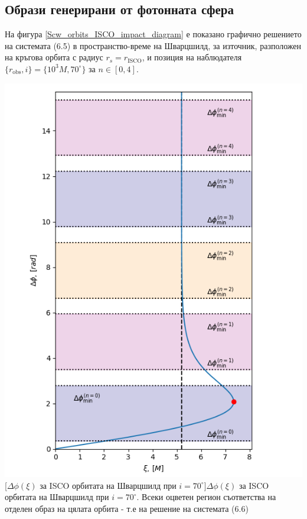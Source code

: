 \subsection{Образи генерирани от фотонната сфера}
На фигура \ref{Scw_orbits_ISCO_impact_diagram} е показано графично решението на системата (6.5) в пространство-време на Шварцшилд, за източник, разположен на кръгова орбита с радиус $r_s = r_{\text{ISCO}}$, и позиция на наблюдателя $\{r_\text{obs}, i\} = \{10^3M, 70^\circ\}$ за $n\in[0,4]$.\\\newline
\begin{minipage}{16em}
\hspace{-0.5cm}
\includegraphics[scale = 0.5]{Schw_70_deg_ISCO_impact.png}
[$\Delta\phi(\xi)$ за ISCO орбитата на Шварцшилд при $i = 70^\circ$]{\small $\Delta\phi(\xi)$ за ISCO орбитата на Шварцшилд при $i = 70^\circ$. Всеки оцветен регион съответства на отделен образ на цялата орбита - т.е на решение на системата (6.6)}
\label{Scw_orbits_ISCO_impact_diagram}
\end{minipage}\,\,\,
